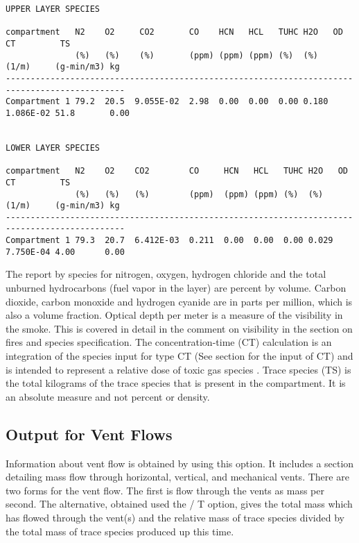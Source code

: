 \begin{lstlisting}[basicstyle=\scriptsize]
UPPER LAYER SPECIES

compartment   N2    O2     CO2       CO    HCN   HCL   TUHC H2O   OD        CT         TS
              (%)   (%)    (%)       (ppm) (ppm) (ppm) (%)  (%)   (1/m)     (g-min/m3) kg
----------------------------------------------------------------------------------------------
Compartment 1 79.2  20.5  9.055E-02  2.98  0.00  0.00  0.00 0.180 1.086E-02 51.8       0.00


LOWER LAYER SPECIES

compartment   N2    O2    CO2        CO     HCN   HCL   TUHC H2O   OD        CT         TS
              (%)   (%)   (%)        (ppm)  (ppm) (ppm) (%)  (%)   (1/m)     (g-min/m3) kg
----------------------------------------------------------------------------------------------
Compartment 1 79.3  20.7  6.412E-03  0.211  0.00  0.00  0.00 0.029 7.750E-04 4.00      0.00
\end{lstlisting}
The report by species for nitrogen, oxygen, hydrogen chloride and the total unburned hydrocarbons (fuel vapor in the layer) are percent by volume. Carbon dioxide, carbon monoxide and hydrogen cyanide are in parts per million, which is also a volume fraction.  Optical depth per meter is a measure of the visibility in the smoke. This is covered in detail in the comment on visibility in the section on fires and species specification. The concentration-time (CT) calculation is an integration of the species input for type CT (See section  for the input of CT) and is intended to represent a relative dose of toxic gas species . Trace species (TS) is the total kilograms of the trace species that is present in the compartment. It is an absolute measure and not percent or density.


\subsection{Output for Vent Flows}

Information about vent flow is obtained by using this option.  It includes a section detailing mass flow through horizontal, vertical, and mechanical vents. There are two forms for the vent flow. The first is flow through the vents as mass per second. The alternative, obtained used the / T option, gives the total mass which has flowed through the vent(s) and the relative mass of trace species divided by the total mass of trace species produced up this time.

